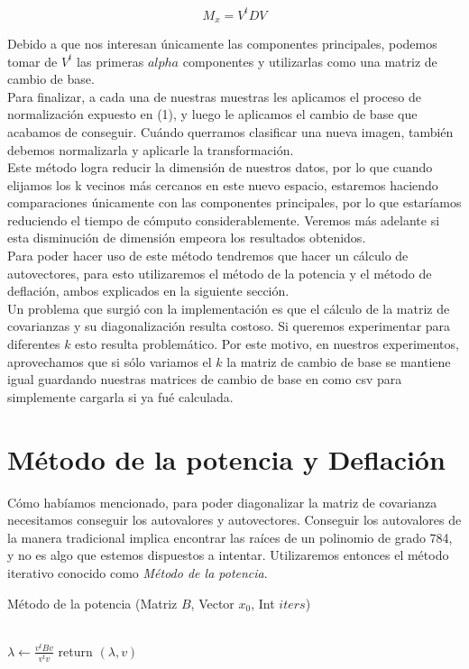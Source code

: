 $$ M_x = V^t D V$$

Debido a que nos interesan únicamente las componentes principales, podemos tomar de $V^t$ las primeras $alpha$ componentes y utilizarlas como una matriz de cambio de base. \\

Para finalizar, a cada una de nuestras muestras les aplicamos el proceso de normalización expuesto en (1), y luego le aplicamos el cambio de base que acabamos de conseguir. Cuándo querramos clasificar una nueva imagen, también debemos normalizarla y aplicarle la transformación. \\

Este método logra reducir la dimensión de nuestros datos, por lo que cuando elijamos los k vecinos más cercanos en este nuevo espacio, estaremos haciendo comparaciones únicamente con las componentes principales, por lo que estaríamos reduciendo el tiempo de cómputo considerablemente. Veremos más adelante si esta disminución de dimensión empeora los resultados obtenidos. \\

Para poder hacer uso de este método tendremos que hacer un cálculo de autovectores, para esto utilizaremos el método de la potencia y el método de deflación, ambos explicados en la siguiente sección. \\

Un problema que surgió con la implementación es que el cálculo de la matriz de covarianzas y su diagonalización resulta costoso. Si queremos experimentar para diferentes $k$ esto resulta problemático. Por este motivo, en nuestros experimentos, aprovechamos que si sólo variamos el $k$ la matriz de cambio de base se mantiene igual guardando nuestras matrices de cambio de base en como csv para simplemente cargarla si ya fué calculada. \\

\section{Método de la potencia y Deflación}

Cómo habíamos mencionado, para poder diagonalizar la matriz de covarianza necesitamos conseguir los autovalores y autovectores. Conseguir los autovalores de la manera tradicional implica encontrar las raíces de un polinomio de grado 784, y no es algo que estemos dispuestos a intentar. Utilizaremos entonces el método iterativo conocido como \textit{Método de la potencia}.
\begin{algorithm}
    \caption{Método de la potencia (Matriz $B$, Vector $x_0$, Int $iters$)}
    \begin{algorithmic}[h]
             \\
        \EndFor
        \State  $\lambda \gets \frac{v^tBv}{v^tv}$
        \State return $(\lambda, v)$

    \end{algorithmic}
\end{algorithm}

